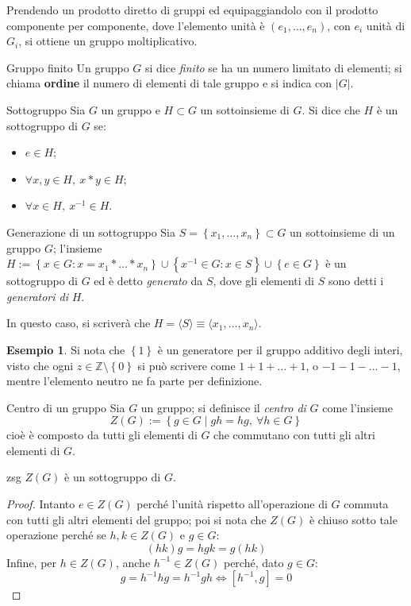 \documentclass[11pt, a4paper]{scrartcl}
\theoremstyle{definition}
\newtheorem{esempio}{Esempio}
\numberwithin{esempio}{section}
\theoremstyle{definition}
\numberwithin{obs}{section}
\numberwithin{nota}{section}
\numberwithin{equation}{subsection}
\begin{document}
\noindent Prendendo un prodotto diretto di gruppi ed equipaggiandolo con il prodotto componente per componente, dove l'elemento unit\`a \`e $(e_1,\ldots,e_n)$, con $e_i$ unit\`a di $G_i$, si ottiene un gruppo moltiplicativo.
\begin{definizione}
	{Gruppo finito}{}
	Un gruppo $G$ si dice \textit{finito} se ha un numero limitato di elementi; si chiama \textbf{ordine} il numero di elementi di tale gruppo e si indica con $|G|$.
\end{definizione}
\begin{definizione}
	{Sottogruppo}{}
	Sia $G$ un gruppo e $H \subset G$ un sottoinsieme di $G$. Si dice che $H$ \`e un sottogruppo di $G$ se:
	\begin{itemize}
		\item  $e \in H$;
		\item $\forall x,y \in H, \ x*y \in H$;
		\item $\forall x \in H, \ x^{-1}  \in H$.
	\end{itemize}
\end{definizione}
\begin{definizione}
	{Generazione di un sottogruppo}{}
	Sia $S = \left\{ x_1,\ldots,x_n \right\} \subset  G$ un sottoinsieme di un gruppo $G$; l'insieme $H:= \left\{ x \in G : x = x_1 *\ldots*x_n  \right\}\cup \left\{ x^{-1} \in G : x \in S \right\} \cup \left\{ e \in G \right\}  $ \`e un sottogruppo di $G$ ed \`e detto \textit{generato} da $S$, dove gli elementi di $S$ sono detti i \textit{generatori di} $H$.

	In questo caso, si scriver\`a che $H = \langle S \rangle\equiv \langle x_1,\ldots,x_n \rangle$.
\end{definizione}
\begin{esempio}\label{1genz}
Si nota che $\left\{ 1 \right\} $ \`e un generatore per il gruppo additivo degli interi, visto che ogni $z \in \mathbb{Z} \setminus\left\{ 0 \right\} $ si pu\`o scrivere come $1 + 1+ \ldots +1$, o $-1 - 1-\ldots-1$, mentre l'elemento neutro ne fa parte per definizione.
\end{esempio}
\begin{definizione}
	{Centro di un gruppo}{}
	Sia $G$ un gruppo; si definisce il \textit{centro di} $G$ come l'insieme 
	\[
	Z(G) := \left\{ g \in G  \mid gh=hg, \ \forall h \in G \right\} 
	\] 
	cio\`e \`e composto da tutti gli elementi di $G$ che commutano con tutti gli altri elementi di $G$.
\end{definizione}
\begin{prop}
	{}{zsg}
	$Z(G)$ \`e un sottogruppo di $G$.
	\begin{proof}
		Intanto $e \in Z(G)$ perch\'e l'unit\`a rispetto all'operazione di $G$ commuta con tutti gli altri elementi del gruppo; poi si nota che $Z(G)$ \`e chiuso sotto tale operazione perch\'e se $h,k \in Z(G)$ e $g\in G$:
		\[
			(hk)g=hgk=g(hk)
		\] 
		Infine, per $h \in Z(G)$, anche $h^{-1}  \in Z(G)$ perch\'e, dato $g \in G$:
		\[
			g = h^{-1}h g  = h^{-1} g h \iff [h^{-1} , g] = 0
		\] 
		
	\end{proof}
\end{prop}
\end{document}

